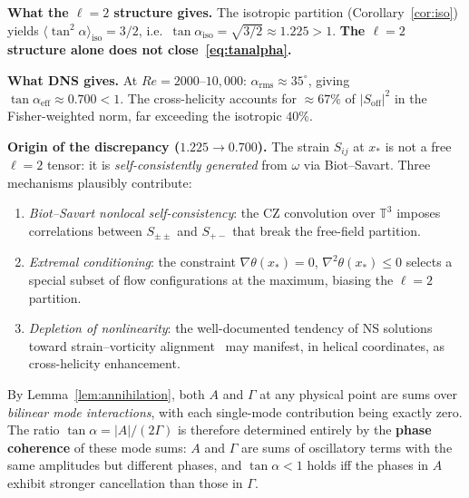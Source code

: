 \documentclass[12pt,a4paper]{article}
\theoremstyle{definition}
\newcommand{\T}{\mathbb{T}}
\begin{document}
\begin{center}
\end{center}

\medskip\noindent
\textbf{What the $\ell=2$ structure gives.}\;
The isotropic partition (Corollary~\ref{cor:iso}) yields
$\langle\tan^2\alpha\rangle_{\mathrm{iso}}=3/2$, i.e.\
$\tan\alpha_{\mathrm{iso}}=\sqrt{3/2}\approx 1.225>1$.
\textbf{The $\ell=2$ structure alone does not close~\eqref{eq:tanalpha}.}

\medskip\noindent
\textbf{What DNS gives.}\;
At $Re=2000$--$10{,}000$:
$\alpha_{\mathrm{rms}}\approx 35^\circ$, giving
$\tan\alpha_{\mathrm{eff}}\approx 0.700<1$.
The cross-helicity accounts for $\approx 67\%$ of $|S_{\mathrm{off}}|^2$
in the Fisher-weighted norm, far exceeding the isotropic $40\%$.

\medskip\noindent
\textbf{Origin of the discrepancy ($1.225\to 0.700$).}\;
The strain $S_{ij}$ at $x_*$ is not a free $\ell=2$ tensor:
it is \emph{self-consistently generated} from $\omega$ via Biot--Savart.
Three mechanisms plausibly contribute:
\begin{enumerate}[label=(\roman*)]
\item \emph{Biot--Savart nonlocal self-consistency}:
  the CZ convolution over $\T^3$ imposes correlations between
  $S_{\pm\pm}$ and $S_{+-}$ that break the free-field partition.
\item \emph{Extremal conditioning}:
  the constraint $\nabla\theta(x_*)=0$, $\nabla^2\theta(x_*)\le 0$
  selects a special subset of flow configurations at the maximum,
  biasing the $\ell=2$ partition.
\item \emph{Depletion of nonlinearity}:
  the well-documented tendency of NS solutions toward
  strain--vorticity alignment~\cite{Wal92} may manifest, in helical
  coordinates, as cross-helicity enhancement.
\end{enumerate}
By Lemma~\ref{lem:annihilation}, both $A$ and $\Gamma$ at any
physical point are sums over \emph{bilinear mode interactions},
with each single-mode contribution being exactly zero.
The ratio $\tan\alpha=|A|/(2\Gamma)$ is therefore determined entirely
by the \textbf{phase coherence} of these mode sums:
$A$ and $\Gamma$ are sums of oscillatory terms with the same amplitudes
but different phases, and $\tan\alpha<1$ holds iff the phases in $A$
exhibit stronger cancellation than those in $\Gamma$.
\end{document}

